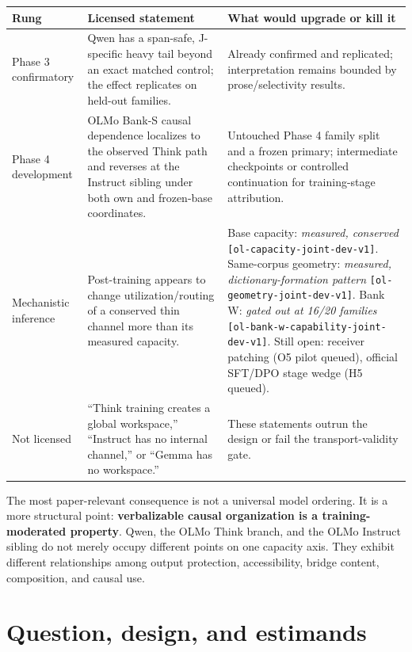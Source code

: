 \documentclass[11pt]{article}
\newcommand{\eid}[1]{{\footnotesize\nolinkurl{[#1]}}}
\begin{document}
\begin{claimbox}
\begin{tabularx}{\textwidth}{@{}p{}X p{}@{}}
\toprule
\textbf{Rung} & \textbf{Licensed statement} & \textbf{What would upgrade or kill it}\\
\midrule
Phase 3 confirmatory & Qwen has a span-safe, J-specific heavy tail beyond an exact matched control; the effect replicates on held-out families. & Already confirmed and replicated; interpretation remains bounded by prose/selectivity results.\\
Phase 4 development & OLMo Bank-S causal dependence localizes to the observed Think path and reverses at the Instruct sibling under both own and frozen-base coordinates. & Untouched Phase 4 family split and a frozen primary; intermediate checkpoints or controlled continuation for training-stage attribution.\\
Mechanistic inference & Post-training appears to change utilization/routing of a conserved thin channel more than its measured capacity. & Base capacity: \emph{measured, conserved} \eid{ol-capacity-joint-dev-v1}. Same-corpus geometry: \emph{measured, dictionary-formation pattern} \eid{ol-geometry-joint-dev-v1}. Bank W: \emph{gated out at 16/20 families} \eid{ol-bank-w-capability-joint-dev-v1}. Still open: receiver patching (O5 pilot queued), official SFT/DPO stage wedge (H5 queued).\\
Not licensed & ``Think training creates a global workspace,'' ``Instruct has no internal channel,'' or ``Gemma has no workspace.'' & These statements outrun the design or fail the transport-validity gate.\\
\bottomrule
\end{tabularx}
\end{claimbox}

The most paper-relevant consequence is not a universal model ordering. It is a
more structural point: \textbf{verbalizable causal organization is a
training-moderated property}. Qwen, the OLMo Think branch, and the OLMo Instruct
sibling do not merely occupy different points on one capacity axis. They exhibit
different relationships among output protection, accessibility, bridge
content, composition, and causal use.

\section{Question, design, and estimands}\label{sec:design}
\end{document}

